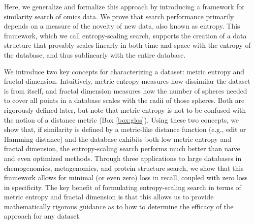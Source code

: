 \documentclass[11pt]{elsarticle}
\theoremstyle{definition}
\theoremstyle{remark}
\numberwithin{equation}{section}
\begin{document}
Here, we generalize and formalize this approach by introducing 
a framework for similarity search of omics data.
We prove that search performance primarily depends on a measure of the novelty of new data, also known as entropy.
This framework, which we call entropy-scaling search, supports the creation of a data structure that provably scales linearly in both time and space with the entropy of the database, and thus sublinearly with the entire database.

We introduce two key concepts for characterizing a dataset: metric entropy and fractal dimension.
Intuitively, metric entropy measures how dissimilar the dataset is from itself, and fractal dimension measures how the number of spheres needed to cover all points in a database scales with the radii of those spheres.
Both are rigorously defined later, but note that metric entropy is not to be confused with the notion of a distance metric (Box \ref{box:glos}).
Using these two concepts, we show that, if similarity is defined by a metric-like distance function (e.g., edit or Hamming distance) and the database exhibits both low metric entropy and fractal dimension, the entropy-scaling search performs much better than naïve and even optimized methods.
Through three applications to large databases in chemogenomics, metagenomics, and protein structure search, we show that this framework allows for minimal (or even zero) loss in recall, coupled with zero loss in specificity.
The key benefit of formulating entropy-scaling search in terms of metric entropy and fractal dimension is that this allows us to provide mathematically rigorous guidance as to how to determine the efficacy of the approach for any dataset.
\end{document}
